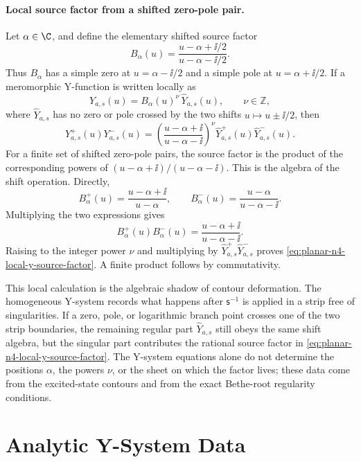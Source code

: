 \paragraph{Local source factor from a shifted zero-pole pair.}
Let \(\alpha\in\C\), and define the elementary shifted source factor
\[
  B_\alpha(u)=\frac{u-\alpha+\ii/2}{u-\alpha-\ii/2}.
\]
Thus \(B_\alpha\) has a simple zero at \(u=\alpha-\ii/2\) and a simple pole at
\(u=\alpha+\ii/2\).  If a meromorphic Y-function is written locally as
\[
  Y_{a,s}(u)=B_\alpha(u)^\nu\,\widehat Y_{a,s}(u),
  \qquad \nu\in\mathbb Z,
\]
where \(\widehat Y_{a,s}\) has no zero or pole crossed by the two shifts
\(u\mapsto u\pm\ii/2\), then
\begin{equation}
  Y_{a,s}^+(u)Y_{a,s}^-(u)
  =
  \left(\frac{u-\alpha+\ii}{u-\alpha-\ii}\right)^\nu
  \widehat Y_{a,s}^+(u)\widehat Y_{a,s}^-(u).
  \label{eq:planar-n4-local-y-source-factor}
\end{equation}
For a finite set of shifted zero-pole pairs, the source factor is the product
of the corresponding powers of
\((u-\alpha+\ii)/(u-\alpha-\ii)\).
This is the algebra of the shift operation.  Directly,
\[
  B_\alpha^+(u)
  =
  \frac{u-\alpha+\ii}{u-\alpha},
  \qquad
  B_\alpha^-(u)
  =
  \frac{u-\alpha}{u-\alpha-\ii}.
\]
Multiplying the two expressions gives
\[
  B_\alpha^+(u)B_\alpha^-(u)
  =
  \frac{u-\alpha+\ii}{u-\alpha-\ii}.
\]
Raising to the integer power \(\nu\) and multiplying by
\(\widehat Y_{a,s}^+\widehat Y_{a,s}^-\) proves
\eqref{eq:planar-n4-local-y-source-factor}.  A finite product follows by
commutativity.

This local calculation is the algebraic shadow of contour deformation.  The
homogeneous Y-system records what happens after \(\mathsf s^{-1}\) is applied
in a strip free of singularities.  If a zero, pole, or logarithmic branch point
crosses one of the two strip boundaries, the remaining regular part
\(\widehat Y_{a,s}\) still obeys the same shift algebra, but the singular part
contributes the rational source factor in
\eqref{eq:planar-n4-local-y-source-factor}.  The Y-system equations alone do
not determine the positions \(\alpha\), the powers \(\nu\), or the sheet on
which the factor lives; these data come from the excited-state contours and
from the exact Bethe-root regularity conditions.

\section{Analytic Y-System Data}

